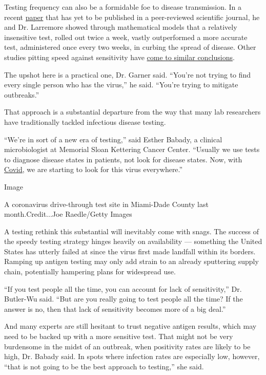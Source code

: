 Testing frequency can also be a formidable foe to disease transmission.
In a recent
\href{https://www.medrxiv.org/content/10.1101/2020.06.22.20136309v2}{paper}
that has yet to be published in a peer-reviewed scientific journal, he
and Dr. Larremore showed through mathematical models that a relatively
insensitive test, rolled out twice a week, vastly outperformed a more
accurate test, administered once every two weeks, in curbing the spread
of disease. Other studies pitting speed against sensitivity have
\href{https://jamanetwork.com/journals/jamanetworkopen/fullarticle/2768923}{come
to similar conclusions}.

The upshot here is a practical one, Dr. Garner said. ``You're not trying
to find every single person who has the virus,'' he said. ``You're
trying to mitigate outbreaks.''

That approach is a substantial departure from the way that many lab
researchers have traditionally tackled infectious disease testing.

``We're in sort of a new era of testing,'' said Esther Babady, a
clinical microbiologist at Memorial Sloan Kettering Cancer Center.
``Usually we use tests to diagnose disease states in patients, not look
for disease states. Now, with
\href{https://www.nytimes3xbfgragh.onion/2020/08/07/us/covid-test-accuracy-governor-dewine-ohio.html}{Covid},
we are starting to look for this virus everywhere.''

Image

A coronavirus drive-through test site in Miami-Dade County last
month.Credit...Joe Raedle/Getty Images

A testing rethink this substantial will inevitably come with snags. The
success of the speedy testing strategy hinges heavily on availability
--- something the United States has utterly failed at since the virus
first made landfall within its borders. Ramping up antigen testing may
only add strain to an already sputtering supply chain, potentially
hampering plans for widespread use.

``If you test people all the time, you can account for lack of
sensitivity,'' Dr. Butler-Wu said. ``But are you really going to test
people all the time? If the answer is no, then that lack of sensitivity
becomes more of a big deal.''

And many experts are still hesitant to trust negative antigen results,
which may need to be backed up with a more sensitive test. That might
not be very burdensome in the midst of an outbreak, when positivity
rates are likely to be high, Dr. Babady said. In spots where infection
rates are especially low, however, ``that is not going to be the best
approach to testing,'' she said.

